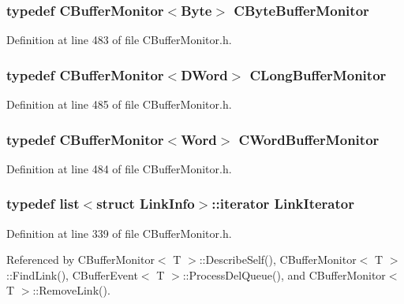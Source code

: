 \subsubsection{\setlength{\rightskip}{0pt plus 5cm}typedef {\bf CBuffer\-Monitor}$<$Byte$>$ CByte\-Buffer\-Monitor}\label{CBufferMonitor_8h_a1}




Definition at line 483 of file CBuffer\-Monitor.h.
\subsubsection{\setlength{\rightskip}{0pt plus 5cm}typedef {\bf CBuffer\-Monitor}$<$DWord$>$ CLong\-Buffer\-Monitor}\label{CBufferMonitor_8h_a3}




Definition at line 485 of file CBuffer\-Monitor.h.
\subsubsection{\setlength{\rightskip}{0pt plus 5cm}typedef {\bf CBuffer\-Monitor}$<$Word$>$ CWord\-Buffer\-Monitor}\label{CBufferMonitor_8h_a2}




Definition at line 484 of file CBuffer\-Monitor.h.
\subsubsection{\setlength{\rightskip}{0pt plus 5cm}typedef list$<$struct {\bf Link\-Info}$>$::iterator Link\-Iterator}\label{CBufferMonitor_8h_a0}




Definition at line 339 of file CBuffer\-Monitor.h.

Referenced by CBuffer\-Monitor$<$ T $>$::Describe\-Self(), CBuffer\-Monitor$<$ T $>$::Find\-Link(), CBuffer\-Event$<$ T $>$::Process\-Del\-Queue(), and CBuffer\-Monitor$<$ T $>$::Remove\-Link().